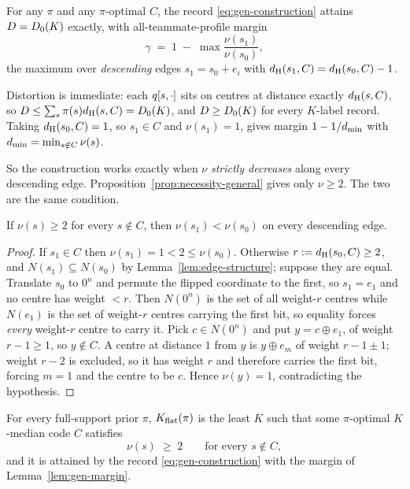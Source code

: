 \begin{lemma}
\label{lem:gen-margin}
For any $\pi$ and any $\pi$-optimal $C$, the record \eqref{eq:gen-construction}
attains $D = D_0(K)$ exactly, with all-teammate-profile margin
\[
  \gamma \;=\; 1 \;-\; \max \frac{\nu(s_1)}{\nu(s_0)},
\]
the maximum over \emph{descending} edges $s_1 = s_0 + e_i$ with
$d_{\mathrm{H}}(s_1,C) = d_{\mathrm{H}}(s_0,C) - 1$.
\end{lemma}

Distortion is immediate: each $q[s,\cdot]$ sits on centres at distance exactly
$d_{\mathrm{H}}(s,C)$, so $D \le \sum_s \pi(s)d_{\mathrm{H}}(s,C) = D_0(K)$, and $D \ge D_0(K)$
for every $K$-label record. Taking $d_{\mathrm{H}}(s_0,C) = 1$, so $s_1 \in C$ and
$\nu(s_1) = 1$, gives margin $1 - 1/d_{\min}$ with
$d_{\min} = \min_{s \notin C} \nu(s)$.

So the construction works exactly when $\nu$ \emph{strictly decreases} along
every descending edge. Proposition~\ref{prop:necessity-general} gives only
$\nu \ge 2$. The two are the same condition.

\begin{lemma}
\label{lem:strict-descent}
If $\nu(s) \ge 2$ for every $s \notin C$, then $\nu(s_1) < \nu(s_0)$ on every
descending edge.
\end{lemma}

\begin{proof}
If $s_1 \in C$ then $\nu(s_1) = 1 < 2 \le \nu(s_0)$. Otherwise
$r := d_{\mathrm{H}}(s_0,C) \ge 2$, and $N(s_1) \subseteq N(s_0)$ by
Lemma~\ref{lem:edge-structure}; suppose they are equal. Translate $s_0$ to $0^n$
and permute the flipped coordinate to the first, so $s_1 = e_1$ and no centre has
weight $< r$. Then $N(0^n)$ is the set of all weight-$r$ centres while $N(e_1)$
is the set of weight-$r$ centres carrying the first bit, so equality forces
\emph{every} weight-$r$ centre to carry it. Pick $c \in N(0^n)$ and put
$y = c \oplus e_1$, of weight $r-1 \ge 1$, so $y \notin C$. A centre at distance
$1$ from $y$ is $y \oplus e_m$ of weight $r-1\pm1$; weight $r-2$ is excluded, so
it has weight $r$ and therefore carries the first bit, forcing $m = 1$ and the
centre to be $c$. Hence $\nu(y) = 1$, contradicting the hypothesis.
\end{proof}

\begin{theorem}
\label{thm:prior}
For every full-support prior $\pi$, $K_{\mathrm{flat}}(\pi)$ is the least $K$ such that some
$\pi$-optimal $K$-median code $C$ satisfies
\[
  \nu(s) \;\ge\; 2 \qquad \text{for every } s \notin C ,
\]
and it is attained by the record \eqref{eq:gen-construction} with the margin of
Lemma~\ref{lem:gen-margin}.
\end{theorem}


